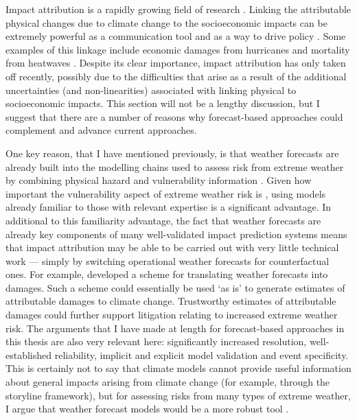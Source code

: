      Impact attribution is a rapidly growing field of research \citep{perkins-kirkpatrick_attribution_2022,burger_law_2020}. Linking the attributable physical changes due to climate change to the socioeconomic impacts can be extremely powerful as a communication tool and as a way to drive policy \citep{clarke_inventories_2021}. Some examples of this linkage include economic damages from hurricanes \citep{frame_economic_2020,strauss_economic_2021} and mortality from heatwaves \citep{mitchell_attributing_2016,mitchell_climate_2021,lo_estimating_2022}. Despite its clear importance, impact attribution has only taken off recently, possibly due to the difficulties that arise as a result of the additional uncertainties (and non-linearities) associated with linking physical to socioeconomic impacts. This section will not be a lengthy discussion, but I suggest that there are a number of reasons why forecast-based approaches could complement and advance current approaches.

      One key reason, that I have mentioned previously, is that weather forecasts are already built into the modelling chains used to assess risk from extreme weather by combining physical hazard and vulnerability information \citep{schaller_role_2020}. Given how important the vulnerability aspect of extreme weather risk is \citep{raju_stop_2022,mitchell_increased_2022}, using models already familiar to those with relevant expertise is a significant advantage. In additional to this familiarity advantage, the fact that weather forecasts are already key components of many well-validated impact prediction systems \citep[for example, the GloFAS flood warning system][]{alfieri_glofas_2013} means that impact attribution may be able to be carried out with very little technical work --- simply by switching operational weather forecasts for counterfactual ones. For example, \citet{wilkinson_consequence_2022} developed a scheme for translating weather forecasts into damages. Such a scheme could essentially be used `as is' to generate estimates of attributable damages to climate change. Trustworthy estimates of attributable damages could further support litigation relating to increased extreme weather risk. The arguments that I have made at length for forecast-based approaches in this thesis are also very relevant here: significantly increased resolution, well-established reliability, implicit and explicit model validation and event specificity. This is certainly not to say that climate models cannot provide useful information about general impacts arising from climate change (for example, through the storyline framework), but for assessing risks from many types of extreme weather, I argue that weather forecast models would be a more robust tool \citep{palmer_simple_2018}.

